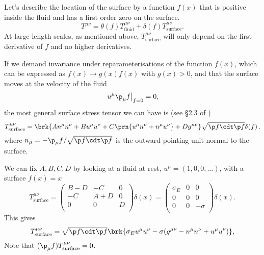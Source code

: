 Let's describe the location of the surface by a function $f(x)$ that is positive inside the fluid and has a first order zero on the surface.
%
\begin{equation}\label{fluidsurf:eq}
  T^{\mu\nu} = \theta(f)T^{\mu\nu}_\text{fluid} + \delta(f)T^{\mu\nu}_\text{surface}.
\end{equation}
%
At large length scales, as mentioned above, $T^{\mu\nu}_\text{surface}$ will only depend on the first derivative of $f$ and no higher derivatives.

If we demand invariance under reparameterisations of the function $f(x)$, which can be expressed as $f(x) \to g(x)f(x)$ with $g(x) > 0$, and that the surface moves at the velocity of the fluid
%
\begin{equation}\label{surfvel:eq}
  \left. u^\mu \p_\mu f \right\vert_{f=0} =0,
\end{equation}
%
the most general surface stress tensor we can have is (see \S2.3 of \cite{Lahiri:2007ae})
%
\begin{equation*}
    T^{\mu\nu}_\mathrm{surface} = \brk{A n^\mu n^\nu
                   +B u^\mu u^\nu
                   +C \prn{u^\mu n^\nu + n^\mu u^\nu}
                   +D g^{\mu\nu}}\sqrt{\p f\cdt\p f}\delta(f)\,.
\end{equation*}
%
%
where $n_\mu = -\p_\mu f / \sqrt{\p f \cdt \p f}$ is the outward pointing unit normal to the surface.

We can fix $A,B,C,D$ by looking at a fluid at rest, $u^\mu = (1,0,0,\ldots)$, with a surface $f(x)=x$
%
\begin{equation*}
  T^{\mu\nu}_\mathrm{surface} =
  \begin{pmatrix}
    B-D & -C   & 0  \\
    -C   & A+D & 0  \\
    0   & 0   & D  \\
  \end{pmatrix}
     \delta(x)=
  \begin{pmatrix}
    \sigma_E & 0 &  0   \\
    0 & 0 &  0   \\
    0 & 0 & -\sigma   \\
  \end{pmatrix}
     \delta(x).
\end{equation*}
%
This gives
%
\begin{equation}\label{surfstressgen:eq}
  T^{\mu\nu}_\text{surface} = \sqrt{\p f \cdt \p f} \brk{\sigma_E u^\mu u^\nu -\sigma(g^{\mu\nu}- n^\mu n^\nu + u^\mu u^\nu)},
\end{equation}
%
Note that $(\p_\mu f) T^{\mu\nu}_\text{surface}=0$.

